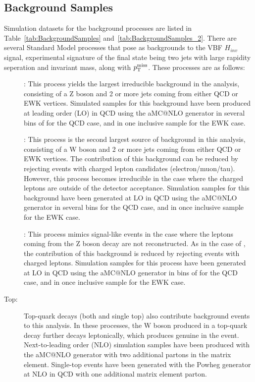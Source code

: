 \subsection{Background Samples}


Simulation datasets for the background processes are listed in
Table~\ref{tab:BackgroundSamples} and~\ref{tab:BackgroundSamples_2}.
There are several Standard Model processes that pose as backgrounds to the VBF $H_{inv}$ signal, experimental signature of the
final state being two jets with large rapidity seperation and invariant mass, along with $p_{\mathrm{T}}^{\mathrm{miss}}$.
These processes are as follows:

\begin{description}
\item[\Zvvjets]: This process yields the largest irreducible background in the analysis, consisting of a Z boson and 2 or more
jets coming from either QCD or EWK vertices. Simulated samples for this background have been produced at leading
order (LO) in QCD using the aMC@NLO generator in several bins of \Ht for the QCD case, and in one inclusive sample for the EWK case.

\item[\Wjets]: This process is the second largest source of background in this analysis, consisting of a W boson and 2 or more
jets coming from either QCD or EWK vertices. The contribution of this background can be reduced by rejecting events with
charged lepton candidates (electron/muon/tau).
However, this process becomes irreducible in the case where the charged leptons are outside of the detector acceptance.
Simulation samples for this background have been generated at LO in QCD using the aMC@NLO generator in several bins \Ht for the QCD case, and in once inclusive sample for the EWK case.

\item[\Zlljets]: This process mimics signal-like events in the case where the leptons coming from the Z boson decay are
not reconstructed. As in the case of \Wlv, the contribution of this background is reduced by rejecting events with charged leptons.
Simulation samples for this process have been generated at LO in QCD using the aMC@NLO generator in bins of \Ht for the QCD case, and in once inclusive sample for the EWK case.

\item[Top:] Top-quark decays (both \ttbar and single top) also contribute background events to this analysis.
In these processes, the W boson produced in a top-quark decay further decays leptonically, which produces genuine \ptmiss in the event.
Next-to-leading order (NLO) \ttbar simulation samples have been produced with the aMC@NLO generator with two additional partons in the matrix element.
Single-top events have been generated with the Powheg generator at NLO in QCD with one additional matrix element parton.


\end{description}
